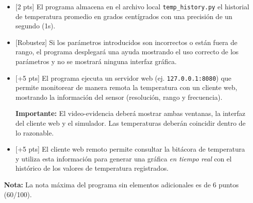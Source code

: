 \begin{itemize}
	\item{} [2 pts] El programa almacena en el archivo local \texttt{temp\_history.py} el historial de temperatura promedio en grados centígrados con una precisión de un segundo (1s).

	\item{} [Robustez] Si los parámetros introducidos son incorrectos o están fuera de rango, el programa desplegará una ayuda mostrando el uso correcto de los parámetros y no se mostrará ninguna interfaz gráfica.

	\item{} [+5 pts] El programa ejecuta un servidor web (ej. \texttt{127.0.0.1:8080}) que permite monitorear de manera remota la temperatura con un cliente web, mostrando la información del sensor (resolución, rango y frecuencia).

	\textbf{Importante:} El video-evidencia deberá mostrar ambas ventanas, la interfaz del cliente web y el simulador. Las temperaturas deberán coincidir dentro de lo razonable.

	\item{} [+5 pts] El cliente web remoto permite consultar la bitácora de temperatura y utiliza esta información para generar una gráfica \emph{en tiempo real} con el histórico de los valores de temperatura registrados.
\end{itemize}

\noindent\textbf{Nota:} La nota máxima del programa sin elementos adicionales es de 6 puntos (60/100).

